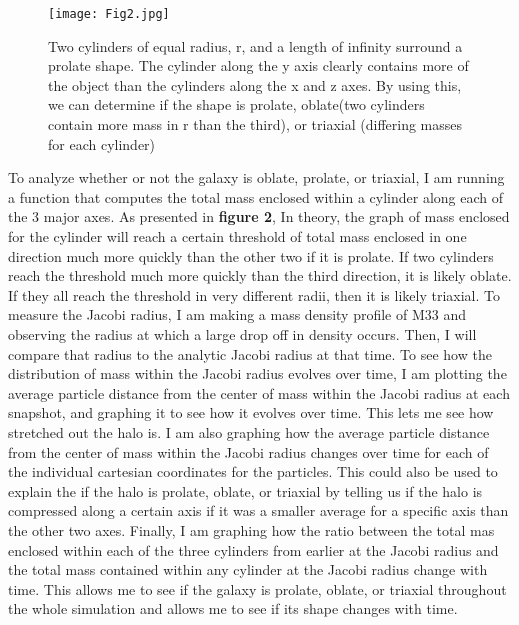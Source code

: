 \documentclass[fleqn,usenatbib]{mnras}
\begin{document}
\begin{figure}
                \centering
                \texttt{[image: Fig2.jpg]}
                \label{fig:enter-label}
            \caption{ Two cylinders of equal radius, r, and a length of infinity surround a prolate shape. The cylinder along the y axis clearly contains more of the object than the cylinders along the x and z axes. By using this, we can determine if the shape is prolate, oblate(two cylinders contain more mass in r than the third), or triaxial (differing masses for each cylinder)}
            \end{figure}
        To analyze whether or not the galaxy is oblate, prolate, or triaxial, I am running a function that computes the total mass enclosed within a cylinder along each of the 3 major axes. As presented in \textbf{figure 2}, In theory, the graph of mass enclosed for the cylinder will reach a certain threshold of total mass enclosed in one direction much more quickly than the other two if it is prolate. If two cylinders reach the threshold much more quickly than the third direction, it is likely oblate. If they all reach the threshold in very different radii, then it is likely triaxial. To measure the Jacobi radius, I am making a mass density profile of M33 and observing the radius at which a large drop off in density occurs. Then, I will compare that radius to the analytic Jacobi radius at that time. To see how the distribution of mass within the Jacobi radius evolves over time, I am plotting the average particle distance from the center of mass within the Jacobi radius at each snapshot, and graphing it to see how it evolves over time. This lets me see how stretched out the halo is. I am also graphing how the average particle distance from the center of mass within the Jacobi radius changes over time for each of the individual cartesian coordinates for the particles. This could also be used to explain the if the halo is prolate, oblate, or triaxial by telling us if the halo is compressed along a certain axis if it was a smaller average for a specific axis than the other two axes. Finally, I am graphing how the ratio between the total mas enclosed within each of the three cylinders from earlier at the Jacobi radius and the total mass contained within any cylinder at the Jacobi radius change with time. This allows me to see if the galaxy is prolate, oblate, or triaxial throughout the whole simulation and allows me to see if its shape changes with time.
\end{document}
